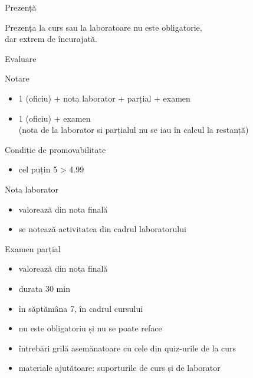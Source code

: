 \documentclass[xcolor=pdftex,romanian,colorlinks]{beamer}
\begin{document}

\begin{frame}{Prezență}

Prezența la curs sau la laboratoare nu este obligatorie, \\dar extrem de încurajată.


\end{frame}

\begin{frame}{Evaluare}
\begin{block}{Notare}
\begin{itemize}
\item {} 1 (oficiu) + nota laborator + parțial + examen 
\item {} 1 (oficiu) +  examen \\ (nota de la laborator si parțialul nu se iau în calcul la restanță) 
\end{itemize}
\end{block}


\begin{block}{Condiție de promovabilitate}
\begin{itemize}
\item  \alert{cel puțin 5} > 4.99
\end{itemize}
\end{block}
\end{frame}

\begin{frame}{Nota laborator}
\begin{itemize}
	\item valorează  din nota finală
	\item se notează activitatea din cadrul laboratorului
\end{itemize}
\end{frame}

\begin{frame}{Examen parțial}
\begin{itemize}
	\item valorează  din nota finală
	\item durata 30 min
	\item în săptămâna 7, în cadrul cursului
	\item nu este obligatoriu și nu se poate reface
	\item întrebări grilă asemănatoare cu cele din quiz-urile de la curs 
	\item materiale ajutătoare: suporturile de curs și de laborator
\end{itemize}
\end{frame}
\end{document}
